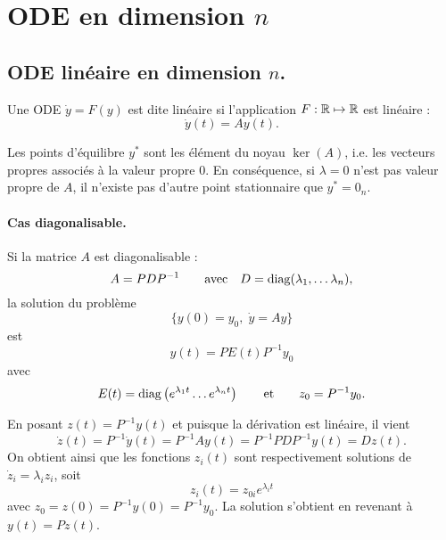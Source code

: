 \section{ODE en dimension $n$} \label{sec:EquaDiff-nonLineaire}

\subsection{ODE linéaire en dimension $n$.}

\begin{definition}
  Une ODE $\dot y = F(y)$ est dite linéaire si l'application $F : \mathbb{R} \mapsto \mathbb{R}$ est linéaire : 
  $$
  \dot y (t) = A y(t).
  $$
\end{definition}

\remark
Les points d'équilibre $y^*$ sont les élément du noyau $\ker(A)$, i.e. les vecteurs propres associés à la valeur propre 0. En conséquence, si $\lambda = 0$ n'est pas valeur propre de $A$, il n'existe pas d'autre point stationnaire que $y^* = 0_n$.

\paragraph*{Cas diagonalisable.}

\begin{proposition} \label{prop:odeLineaireDiagonalisable}
  Si la matrice $A$ est diagonalisable : 
  $$
  A = P D P^{-1}
  \qquad \text{avec}  \quad 
  D = \operatorname{diag}(\lambda_1, \dots \lambda_n),
  $$
  la solution du problème
  $$
  \{y(0) = y_0, \; \dot y = A y\}
  $$
  est
  $$
  y(t) = P E(t) P^{-1} y_0  
  $$
  avec
  $$
  E(t) = \operatorname{diag}\left(e^{\lambda_1 t} \dots e^{\lambda_n t} \right)
  \qquad \text{et} \qquad
  z_0 = P^{-1} y_0.
  $$
\end{proposition}

En posant $z(t) = P^{-1} y(t)$ et puisque la dérivation est linéaire, il vient 
$$
\dot z (t) = P^{-1} \dot y(t) = P^{-1} A y(t) = P^{-1} P D P^{-1} y(t) = D z(t).
$$
On obtient ainsi que les fonctions $z_i(t)$ sont respectivement solutions de $\dot z_i = \lambda_i z_i$, soit 
$$
z_i(t) = z_{0i} e^{\lambda_i t}
$$
avec $z_0 = z(0) = P^{-1} y(0) = P^{-1} y_0$. La solution s'obtient en revenant à $y(t) = P z(t)$.
\eproof

